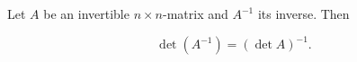 Let $A$ be an invertible $n \times n$-matrix and $A^{-1}$ its inverse. Then

$$\det (A^{-1}) = (\det A)^{-1}.$$
